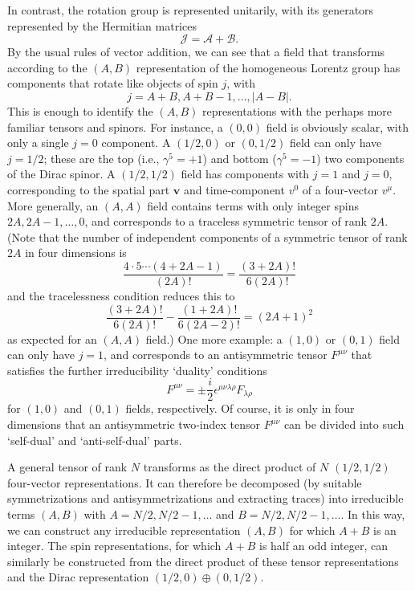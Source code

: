 In contrast, the rotation group is represented unitarily, with its generators
represented by the Hermitian matrices
\begin{equation}
\mathcal{J}=\mathcal{A}+\mathcal{B}.
\tag{5.6.18}\label{eq:5.6.18}
\end{equation}
By the usual rules of vector addition, we can see that a field that transforms
according to the $(A,B)$ representation of the homogeneous Lorentz group has
components that rotate like objects of spin $j$, with
\[
j=A+B,A+B-1,\ldots,|A-B|.
\]
This is enough to identify the $(A,B)$ representations with the perhaps more
familiar tensors and spinors. For instance, a $(0,0)$ field is obviously
scalar, with only a single $j=0$ component. A $(1/2,0)$ or $(0,1/2)$ field can
only have $j=1/2$; these are the top (i.e., $\gamma^5=+1$) and bottom
($\gamma^5=-1$) two components of the Dirac spinor. A $(1/2,1/2)$ field has
components with $j=1$ and $j=0$, corresponding to the spatial part
$\mathbf v$ and time-component $v^0$ of a four-vector $v^\mu$. More generally,
an $(A,A)$ field contains terms with only integer spins
$2A,2A-1,\ldots,0$, and corresponds to a traceless symmetric tensor of rank
$2A$. (Note that the number of independent components of a symmetric tensor
of rank $2A$ in four dimensions is
\[
\frac{4\cdot5\cdots(4+2A-1)}{(2A)!}=\frac{(3+2A)!}{6(2A)!}
\]
and the tracelessness condition reduces this to
\[
\frac{(3+2A)!}{6(2A)!}-\frac{(1+2A)!}{6(2A-2)!}=(2A+1)^2
\]
as expected for an $(A,A)$ field.) One more example: a $(1,0)$ or $(0,1)$
field can only have $j=1$, and corresponds to an antisymmetric tensor
$F^{\mu\nu}$ that satisfies the further irreducibility `duality' conditions
\[
F^{\mu\nu}=\mathbin{\pm}\frac{i}{2}\epsilon^{\mu\nu\lambda\rho}F_{\lambda\rho}
\]
for $(1,0)$ and $(0,1)$ fields, respectively. Of course, it is only in four
dimensions that an antisymmetric two-index tensor $F^{\mu\nu}$ can be divided
into such `self-dual' and `anti-self-dual' parts.

A general tensor of rank $N$ transforms as the direct product of $N$
$(1/2,1/2)$ four-vector representations. It can therefore be decomposed (by
suitable symmetrizations and antisymmetrizations and extracting traces) into
irreducible terms $(A,B)$ with $A=N/2,N/2-1,\ldots$ and
$B=N/2,N/2-1,\ldots$. In this way, we can construct any irreducible
representation $(A,B)$ for which $A+B$ is an integer. The spin
representations, for which $A+B$ is half an odd integer, can similarly be
constructed from the direct product of these tensor representations and the
Dirac representation $(1/2,0)\oplus(0,1/2)$.

